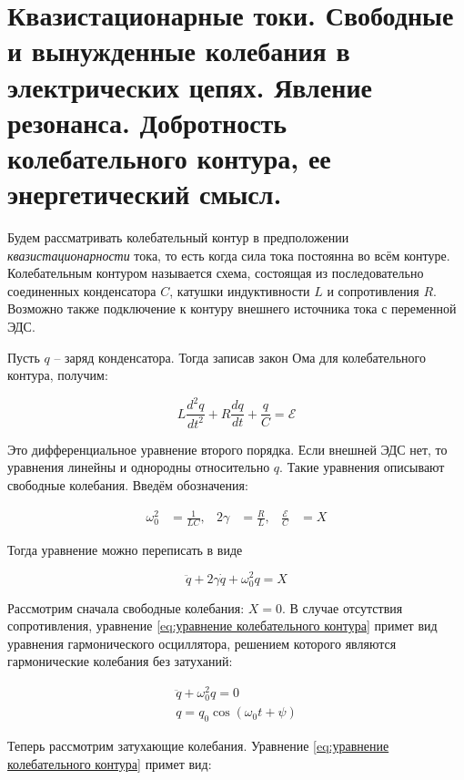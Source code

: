 \section{Квазистационарные токи. Свободные и вынужденные колебания в электрических цепях. Явление
резонанса. Добротность колебательного контура, ее энергетический смысл.}

Будем рассматривать колебательный контур в предположении \textit{квазистационарности} тока, то есть когда сила тока постоянна во всём контуре. Колебательным контуром называется схема, состоящая из последовательно соединенных конденсатора $C$, катушки индуктивности $L$ и сопротивления $R$. Возможно также подключение к контуру внешнего источника тока с переменной ЭДС.

Пусть $q$ -- заряд конденсатора. Тогда записав закон Ома для колебательного контура, получим:

\begin{equation}
    L \frac{d^2 q}{d t^2} + R \frac{d q}{d t} + \frac{q}{C} = \mathcal{E}
\end{equation}

\noindent
Это дифференциальное уравнение второго порядка. Если внешней ЭДС нет, то уравнения линейны и однородны относительно $q$. Такие уравнения описывают свободные колебания. Введём обозначения:

\begin{align*}
    \omega_0^2 &= \frac{1}{L C}, & 2 \gamma &= \frac{R}{L}, & \frac{\mathcal{E}}{C} &= X
\end{align*}

\noindent
Тогда уравнение можно переписать в виде

\begin{equation} \label{eq:уравнение колебательного контура}
    \ddot q + 2 \gamma \dot q + \omega_0^2 q = X
\end{equation}

Рассмотрим сначала свободные колебания: $X = 0$. В случае отсутствия сопротивления, уравнение \eqref{eq:уравнение колебательного контура} примет вид уравнения гармонического осциллятора, решением которого являются гармонические колебания без затуханий:

\begin{align}
    \ddot q + \omega_0^2 q = 0 \\
    q = q_0 \cos \left( \omega_0 t + \psi \right)
\end{align}

Теперь рассмотрим затухающие колебания. Уравнение \eqref{eq:уравнение колебательного контура} примет вид:

